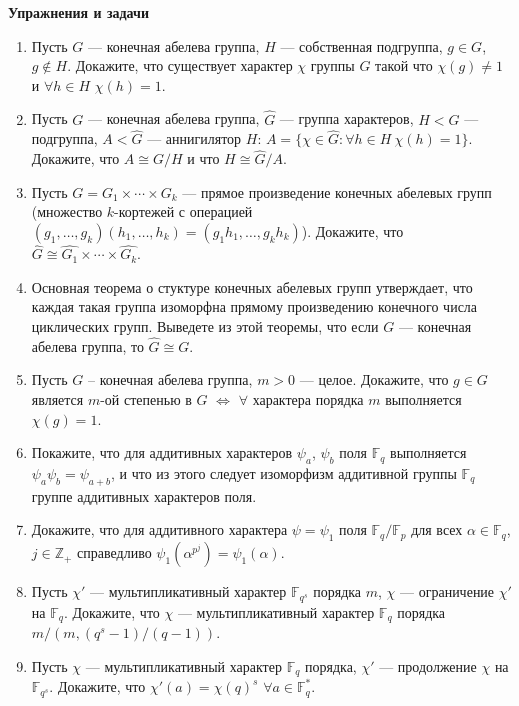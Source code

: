 \noindent\textbf{Упражнения и задачи}

\begin{enumerate}[topsep=0pt]
    \item Пусть $G$ --- конечная абелева группа, $H$ --- собственная подгруппа, $g\in G$, $g \not\in H$. Докажите, что существует характер $\chi$ группы $G$ такой что $\chi(g)\neq 1$ и $\forall h\in H$ $\chi(h)=1$. %
    \item Пусть $G$ --- конечная абелева группа, $\widehat{G}$ --- группа характеров, $H < G$ ---  подгруппа, $A < \widehat{G}$ --- аннигилятор $H$: $A=\{\chi\in\widehat{G}: \forall h\in H\ \chi(h)=1 \}$. Докажите, что $A\cong G/H$ и что $H\cong \widehat{G}/A$. %
    \item Пусть $G = G_1\times \cdots \times G_k$ --- прямое произведение конечных абелевых групп (множество $k$-кортежей с операцией $(g_1,\dots,g_k) (h_1,\dots,h_k) = (g_1 h_1, \dots, g_k h_k)$). Докажите, что $\widehat{G}\cong \widehat{G_1}\times \cdots \times \widehat{G_k}$. %
    \item Основная теорема о стуктуре конечных абелевых групп утверждает, что каждая такая группа изоморфна прямому произведению конечного числа циклических групп. Выведете из этой теоремы, что если $G$ --- конечная абелева группа, то $\widehat{G}\cong G$. %
    \item Пусть $G$ -- конечная абелева группа, $m>0$ --- целое. Докажите, что $g\in G$ является $m$-ой степенью в $G$ $\iff$ $\forall$ характера порядка $m$ выполняется $\chi(g)=1$. %
    \item Покажите, что для аддитивных характеров $\psi_a$, $\psi_b$ поля $\mathbb{F}_q$ выполняется $\psi_a \psi_b = \psi_{a+b}$, и что из этого следует изоморфизм аддитивной группы $\mathbb{F}_q$ группе аддитивных характеров поля. %
    \item Докажите, что для аддитивного характера $\psi=\psi_1$ поля $\mathbb{F}_q/\mathbb{F}_p$ для всех $\alpha\in\mathbb{F}_q$, $j\in\mathbb{Z}_+$ справедливо $\psi_1(\alpha^{p^j})=\psi_1(\alpha)$. %
    \item Пусть $\chi'$ --- мультипликативный характер $\mathbb{F}_{q^s}$ порядка $m$, $\chi$ --- ограничение $\chi'$ на $\mathbb{F}_q$. Докажите, что $\chi$ --- мультипликативный характер $\mathbb{F}_q$ порядка $m/(m,(q^s-1)/(q-1))$. %
    \item Пусть $\chi$ --- мультипликативный характер $\mathbb{F}_q$ порядка, $\chi'$ --- продолжение $\chi$ на $\mathbb{F}_{q^s}$. Докажите, что $\chi'(a)=\chi(q)^s$ $\forall a \in\mathbb{F}_q^{*}$. %

\end{enumerate}
